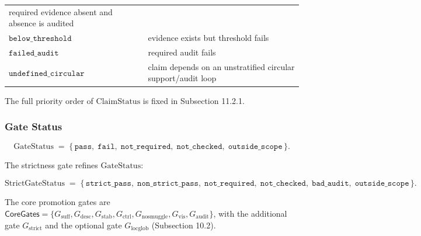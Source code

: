 \documentclass[11pt]{article}
\theoremstyle{definition}
\begin{document}
\begin{longtable}[]{@{}ll@{}}
\begin{minipage}[t]{0.68\columnwidth}
required evidence absent and absence is audited\strut
\end{minipage}\tabularnewline
\begin{minipage}[t]{0.26\columnwidth}\raggedright
\(\texttt{below\_threshold}\)\strut
\end{minipage} & \begin{minipage}[t]{0.68\columnwidth}\raggedright
evidence exists but threshold fails\strut
\end{minipage}\tabularnewline
\begin{minipage}[t]{0.26\columnwidth}\raggedright
\(\texttt{failed\_audit}\)\strut
\end{minipage} & \begin{minipage}[t]{0.68\columnwidth}\raggedright
required audit fails\strut
\end{minipage}\tabularnewline
\begin{minipage}[t]{0.26\columnwidth}\raggedright
\(\texttt{undefined\_circular}\)\strut
\end{minipage} & \begin{minipage}[t]{0.68\columnwidth}\raggedright
claim depends on an unstratified circular support/audit loop\strut
\end{minipage}\tabularnewline
\bottomrule
\end{longtable}

The full priority order of \(\mathrm{ClaimStatus}\) is fixed in Subsection 11.2.1.

\subsubsection{Gate Status}

\[
\mathrm{GateStatus}\;=\;\{\,\texttt{pass},\;\texttt{fail},\;\texttt{not\_required},\;\texttt{not\_checked},\;\texttt{outside\_scope}\,\}.
\]

The strictness gate refines \(\mathrm{GateStatus}\):

\[
\mathrm{StrictGateStatus}\;=\;\{\,\texttt{strict\_pass},\;\texttt{non\_strict\_pass},\;\texttt{not\_required},\;\texttt{not\_checked},\;\texttt{bad\_audit},\;\texttt{outside\_scope}\,\}.
\]

The core promotion gates are \(\mathsf{CoreGates}=\{G_{\mathrm{suff}},G_{\mathrm{desc}},G_{\mathrm{stab}},G_{\mathrm{ctrl}},G_{\mathrm{nosmuggle}},G_{\mathrm{vis}},G_{\mathrm{audit}}\}\), with the additional gate \(G_{\mathrm{strict}}\) and the optional gate \(G_{\mathrm{locglob}}\) (Subsection 10.2).
\end{document}
